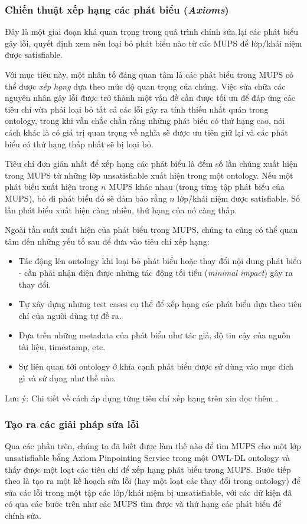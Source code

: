 \subsubsection{Chiến thuật xếp hạng các phát biểu (\textit{Axioms})}
Đây là một giai đoạn khá quan trọng trong quá trình chỉnh sửa lại các phát biểu gây lỗi, quyết định xem nên loại bỏ phát biểu nào từ các MUPS để lớp/khái niệm được satisfiable.

\hspace*{.05\textwidth} Với mục tiêu này, một nhân tố đáng quan tâm là các phát biểu trong MUPS có thể được \textit{xếp hạng} dựa theo mức độ quan trọng của chúng. Việc sửa chữa các nguyên nhân gây lỗi được trở thành một vấn đề cần được tối ưu để đáp ứng các tiêu chí vừa phải loại bỏ tất cả các lỗi gây ra tính thiếu nhất quán trong ontology, trong khi vẫn chắc chắn rằng những phát biểu có thứ hạng cao, nói cách khác là có giá trị quan trọng về nghĩa sẽ được ưu tiên giữ lại và các phát biểu có thứ hạng thấp nhất sẽ bị loại bỏ.

\hspace*{.05\textwidth} Tiêu chí đơn giản nhất để xếp hạng các phát biểu là đếm số lần chúng xuất hiện trong MUPS từ những lớp unsatisfiable xuất hiện trong một ontology. Nếu một phát biểu xuất hiện trong $n$ MUPS khác nhau (trong từng tập phát biểu của MUPS), bỏ đi phát biểu đó sẽ đảm bảo rằng $n$ lớp/khái niệm được satisfiable. Số lần phát biểu xuất hiện càng nhiều, thứ hạng của nó càng thấp.

\hspace*{0.05\textwidth} Ngoài tần suất xuất hiện của phát biểu trong MUPS, chúng ta cũng có thể quan tâm đến những yếu tố sau để đưa vào tiêu chí xếp hạng:
\begin{itemize}
	\item Tác động lên ontology khi loại bỏ phát biểu hoặc thay đổi nội dung phát biểu - cần phải nhận diện được những tác động tối tiểu (\textit{minimal impact})  gây ra thay đổi.
	\item Tự xây dựng những test cases cụ thể để xếp hạng các phát biểu dựa theo tiêu chí của người dùng tự đề ra.
	\item Dựa trên những metadata của phát biểu như tác giả, độ tin cậy của nguồn tài liệu, timestamp, etc.
	\item Sự liên quan tới ontology ở khía cạnh phát biểu được sử dùng vào mục đích gì và sử dụng như thế nào.
\end{itemize}
Lưu ý: Chi tiết về cách áp dụng từng tiêu chí xếp hạng trên xin đọc thêm \cite{repair}.
\subsubsection{Tạo ra các giải pháp sửa lỗi}
	Qua các phần trên, chúng ta đã biết được làm thế nào để tìm MUPS cho một lớp unsatisfiable bằng Axiom Pinpointing Service trong một OWL-DL ontology và thấy được một loạt các tiêu chí để xếp hạng phát biểu trong MUPS. Bước tiếp theo là tạo ra một kế hoạch sửa lỗi (hay một loạt các thay đổi trong ontology) để sửa các lỗi trong một tập các lớp/khái niệm bị unsatisfiable, với các dữ kiện đã có qua các bước trên như các MUPS tìm được và thứ hạng các phát biểu để chính sửa.
	
